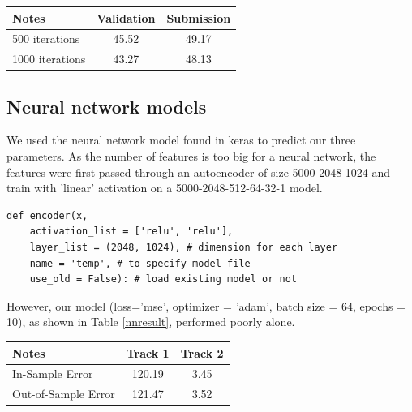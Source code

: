 \documentclass[a4paper, 12pt]{article}
\begin{document}
\begin{multicols}{2}
                    \begin{center}
                        \begin{tabular}{l|cc}
                            Notes & Validation & Submission \\
                            \hline
                            500 iterations & 45.52 & 49.17 \\
                            1000 iterations & 43.27 & 48.13 \\
                        \end{tabular}
                        \label{lightgbmsquared}
                    \end{center}

            \subsection{Neural network models}
                We used the neural network model found in keras \cite{keras} to predict our three parameters. As the number of features is too big for a neural network, the features were first passed through an autoencoder of size 5000-2048-1024 and train with 'linear' activation on a 5000-2048-512-64-32-1 model.
            \begin{lstlisting}
def encoder(x, 
    activation_list = ['relu', 'relu'], 
    layer_list = (2048, 1024), # dimension for each layer
    name = 'temp', # to specify model file
    use_old = False): # load existing model or not
            \end{lstlisting}

            However, our model (loss='mse', optimizer = 'adam', batch size = 64, epochs = 10), as shown in Table \ref{nnresult}, performed poorly alone.
                
            \begin{center}
                \begin{tabular}{l|cc}
                    Notes & Track 1 & Track 2 \\
                    \hline
                    In-Sample Error & 120.19 & 3.45 \\
                    Out-of-Sample Error & 121.47 & 3.52 \\
                \end{tabular}
                \label{nnresult}
            \end{center}
            

\end{multicols}
\end{document}
